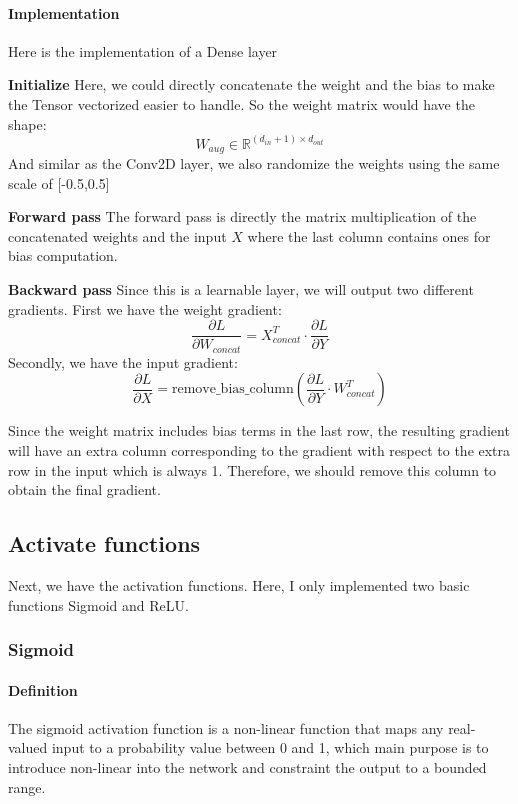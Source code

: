 \documentclass[conference]{IEEEtran}
\begin{document}
\paragraph{Implementation} Here is the implementation of a Dense layer

\textbf{Initialize} Here, we could directly concatenate the weight and the bias to make the Tensor vectorized easier to handle. So the weight matrix would have the shape: \begin{equation}
W_{aug} \in \mathbb{R}^{(d_{in}+1) \times d_{out}}
\end{equation}
And similar as the Conv2D layer, we also randomize the weights using the same scale of [-0.5,0.5]

\textbf{Forward pass} The forward pass is directly the matrix multiplication of the concatenated weights and the input $X$ where the last column contains ones for bias computation.

\textbf{Backward pass} Since this is a learnable layer, we will output two different gradients.
First we have the weight gradient:
\begin{equation}
\frac{\partial L}{\partial W_{concat}} = X_{concat}^T \cdot \frac{\partial L}{\partial Y}
\end{equation}
Secondly, we have the input gradient:
\begin{equation}
\frac{\partial L}{\partial X} = \text{remove\_bias\_column}\left(\frac{\partial L}{\partial Y} \cdot W_{concat}^T\right)
\end{equation}

Since the weight matrix includes bias terms in the last row, the resulting gradient will have an extra column corresponding to the gradient with respect to the extra row in the input which is always 1. Therefore, we should remove this column to obtain the final gradient.

\subsection{Activate functions}
Next, we have the activation functions. Here, I only implemented two basic functions Sigmoid and ReLU.
\subsubsection{Sigmoid}
\paragraph{Definition} The sigmoid activation function is a non-linear function that maps any real-valued input to a probability value between 0 and 1, which main purpose is to introduce non-linear into the network and constraint the output to a bounded range.
\end{document}
